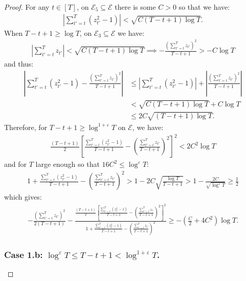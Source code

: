 \begin{proof}
For any $t \in[T]$, on  $\mathcal{E}_5 \subseteq \mathcal{E}$ there is some $C> 0$ so that we have: 
\begin{align*}
     \left|\sum_{t'=t}^T (z_{t'}^2-1)\right| < \sqrt{C(T-t+1)\log T}.
\end{align*}
When $T -t+1 \geq \log T$, on $\mathcal{E}_3 \subseteq \mathcal{E}$ we have:
\begin{align*}
    \left|\sum_{t'=t}^T z_{t'}\right| < \sqrt{C(T-t+1)\log T}\implies - \frac{\left(\sum_{t'=t}^T z_{t'}\right)^2}{T-t+1} > -C \log T
\end{align*}
and thus:
\small
\begin{align*}
    \left|\sum_{t'=t}^T (z_{t'}^2-1) - \frac{\left(\sum_{t'=t}^T z_{t'}\right)^2}{T-t+1}\right| &\leq \left|\sum_{t'=t}^T (z_{t'}^2-1)\right|  + \left| \frac{\left(\sum_{t'=t}^T z_{t'}\right)^2}{T-t+1}\right| \\
    &<\sqrt{C(T-t+1)\log T} + C\log T \\
    &\leq 2C\sqrt{(T-t+1)\log T}. \tag{$T-t+1 > \log T$ and $C > 1$ WLOG} 
\end{align*}
\normalsize
Therefore, for $T -t+1 \geq \log^{1+\varepsilon} T$ on $\mathcal{E}$, we have:
\begin{align*}
    \frac{(T-t+1)}{2}\left[\frac{\sum_{t'=t}^T (z_{t'}^2-1)}{T-t+1} - \left(\frac{\sum_{t'=t}^T z_{t'}}{T-t+1}\right)^2 \right]^2 < 2C^2 \log T
\end{align*}
and for $T$ large enough so that $16C^2 \leq \log^{\varepsilon} T$:
\begin{align*}
    1 + \frac{\sum_{t'=t}^T (z_{t'}^2-1)}{T-t+1} - \left(\frac{\sum_{t'=t}^T z_{t'}}{T-t+1}\right)^2 > 1 - 2C\sqrt{\frac{\log T}{T-t+1}} > 1 - \frac{2C}{\sqrt{\log^{\varepsilon}T}} \geq \frac{1}{2}
\end{align*}
which gives:
\begin{align*}
     - \frac{\left(\sum_{t'=t}^T z_{t'}\right)^2}{2(T-t+1)} - \frac{\frac{(T-t+1)}{2}\left[\frac{\sum_{t'=t}^T (z_{t'}^2-1)}{T-t+1} - \left(\frac{\sum_{t'=t}^T z_{t'}}{T-t+1}\right)^2 \right]^2}{1 + \frac{\sum_{t'=t}^T (z_{t'}^2-1)}{T-t+1} - \left(\frac{\sum_{t'=t}^T z_{t'}}{T-t+1}\right)^2 } \geq - \left(\frac{C}{2} + 4C^2\right)\log T.
\end{align*}

\subsubsection*{Case 1.b: $\log^{\varepsilon} T \leq T -t+1 < \log^{1+\varepsilon} T$.}


\end{proof}
